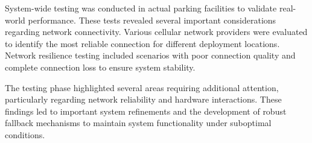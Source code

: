 System-wide testing was conducted in actual parking facilities to validate real-world performance. These tests revealed several important considerations regarding network connectivity. Various cellular network providers were evaluated to identify the most reliable connection for different deployment locations. Network resilience testing included scenarios with poor connection quality and complete connection loss to ensure system stability.



The testing phase highlighted several areas requiring additional attention, particularly regarding network reliability and hardware interactions. These findings led to important system refinements and the development of robust fallback mechanisms to maintain system functionality under suboptimal conditions.

